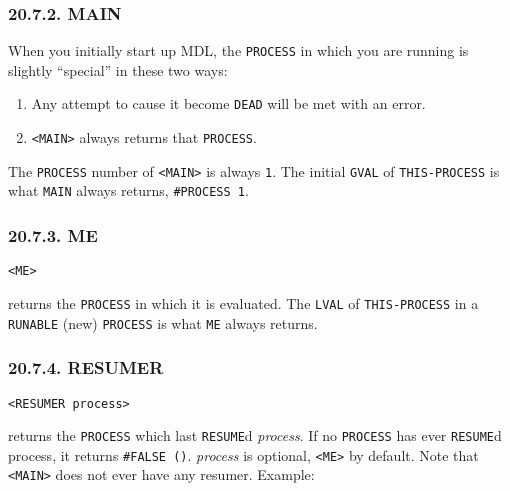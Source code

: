 \documentclass[a4paper,]{article}
\providecommand{\tightlist}{%
  \setlength{\itemsep}{0pt}\setlength{\parskip}{0pt}}
\begin{document}
\subsubsection{20.7.2. MAIN}\label{main}

When you initially start up MDL, the \texttt{PROCESS} in which you are running is slightly ``special'' in these two ways:

\begin{enumerate}
\def\labelenumi{\arabic{enumi}.}
\tightlist
\item
  Any attempt to cause it become \texttt{DEAD} will be met with an error.
\item
  \texttt{\textless{}MAIN\textgreater{}} always returns that \texttt{PROCESS}.
\end{enumerate}

The \texttt{PROCESS} number of \texttt{\textless{}MAIN\textgreater{}} is always \texttt{1}. The initial \texttt{GVAL} of
\texttt{THIS-PROCESS} is what \texttt{MAIN} always returns, \texttt{\#PROCESS\ 1}.

\subsubsection{20.7.3. ME}\label{me}

\begin{verbatim}
<ME>
\end{verbatim}

 returns the \texttt{PROCESS} in which it is evaluated. The \texttt{LVAL} of
\texttt{THIS-PROCESS} in a \texttt{RUNABLE} (new) \texttt{PROCESS} is what \texttt{ME}
always returns.

\subsubsection{20.7.4. RESUMER}\label{resumer}

\begin{verbatim}
<RESUMER process>
\end{verbatim}

 returns the \texttt{PROCESS} which last \texttt{RESUME}d \emph{process}. If no
\texttt{PROCESS} has ever \texttt{RESUME}d process, it returns \texttt{\#FALSE\ ()}. \emph{process} is optional,
\texttt{\textless{}ME\textgreater{}} by default. Note that \texttt{\textless{}MAIN\textgreater{}} does
not ever have any resumer. Example:
\end{document}
